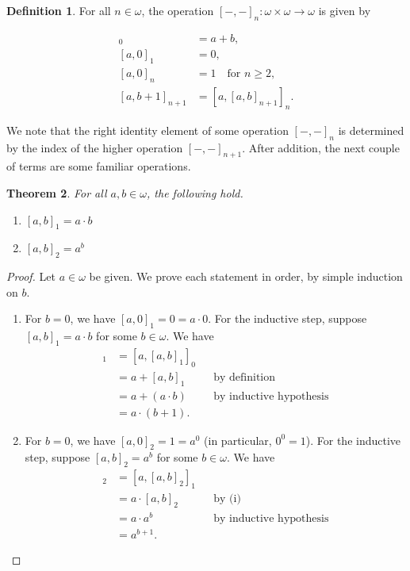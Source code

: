 \documentclass[12pt, a4paper]{article}
\newtheorem{theorem}{Theorem}[section]
\theoremstyle{definition}
\newtheorem{definition}[theorem]{Definition}
\theoremstyle{remark}
\begin{document}
\begin{definition}\label{hypop}
    For all $n \in \omega$, the operation $[-,-]_n : \omega\times\omega \to \omega$ is given by

    \begin{align*}
        [a, b]_0 &= a+b,\\
        [a, 0]_1 &= 0,\\
        [a, 0]_n &= 1 \quad \text{for } n \geq 2,\\
        [a, b+1]_{n+1} &= [a, [a, b]_{n+1}]_n.
    \end{align*}

\end{definition}

We note that the right identity element of some operation $[-,-]_n$ is determined by the index of the higher operation $[-,-]_{n+1}$. After addition, the next couple of terms are some familiar operations.

\begin{theorem}
    For all $a, b \in\omega$, the following hold.
    \begin{enumerate}
        \item[\textnormal{(i)}] $[a,b]_1 = a\cdot b$
        \item[\textnormal{(ii)}] $[a,b]_2 = a^b$
    \end{enumerate}
\end{theorem}

\begin{proof}
    Let $a\in\omega$ be given. We prove each statement in order, by simple induction on $b$.
    \begin{enumerate}
        \item[(i)] For $b=0$, we have $[a,0]_1 = 0 = a\cdot 0$. For the inductive step, suppose $[a,b]_1 = a\cdot b$ for some $b\in\omega$. We have
        \begin{align*}
            [a, b+1]_1 &= [a, [a,b]_1]_0 && \\
                       &= a + [a,b]_1 && \text{by definition} \\
                       &= a + (a\cdot b) && \text{by inductive hypothesis} \\
                       &= a \cdot (b+1).
        \end{align*}
        \item[(ii)] For $b=0$, we have $[a,0]_2 = 1 = a^0$ (in particular, $0^0 = 1$). For the inductive step, suppose $[a,b]_2 = a^b$ for some $b\in\omega$. We have
        \begin{align*}
            [a, b+1]_2 &= [a, [a,b]_2]_1 && \\
                       &= a \cdot [a,b]_2 && \text{by (i)} \\
                       &= a \cdot a^b && \text{by inductive hypothesis} \\
                       &= a^{b+1}.
        \end{align*}
    \end{enumerate}
\end{proof}
\end{document}
